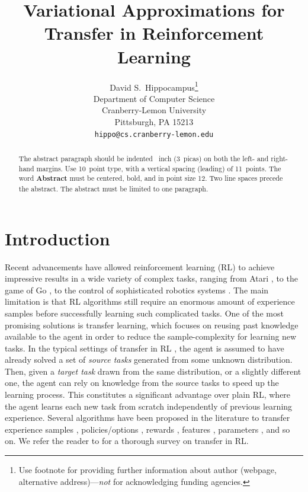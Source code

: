 \documentclass{article}
\title{Variational Approximations for Transfer in Reinforcement Learning}
\author{
  David S.~Hippocampus\thanks{Use footnote for providing further
    information about author (webpage, alternative
    address)---\emph{not} for acknowledging funding agencies.} \\
  Department of Computer Science\\
  Cranberry-Lemon University\\
  Pittsburgh, PA 15213 \\
  \texttt{hippo@cs.cranberry-lemon.edu} \\
}
\begin{document}

\maketitle

\begin{abstract}
  The abstract paragraph should be indented ~inch
  (3~picas) on both the left- and right-hand margins. Use 10~point
  type, with a vertical spacing (leading) of 11~points.  The word
  \textbf{Abstract} must be centered, bold, and in point size 12. Two
  line spaces precede the abstract. The abstract must be limited to
  one paragraph.
\end{abstract}

\section{Introduction}

Recent advancements have allowed reinforcement learning (RL) \cite{sutton1998reinforcement} to achieve impressive results in a wide variety of complex tasks, ranging from Atari \cite{mnih2015human}, to the game of Go \cite{silver2016mastering}, to the control of sophisticated robotics systems \cite{kober2009policy,lillicrap2015continuous,levine2016end}. The main limitation is that RL algorithms still require an enormous amount of experience samples before successfully learning such complicated tasks. One of the most promising solutions is transfer learning, which focuses on reusing past knowledge available to the agent in order to reduce the sample-complexity for learning new tasks. In the typical settings of transfer in RL \cite{taylor2009transfer}, the agent is assumed to have already solved a set of \textit{source tasks} generated from some unknown distribution. Then, given a \textit{target task} drawn from the same distribution, or a slightly different one, the agent can rely on knowledge from the source tasks to speed up the learning process. This constitutes a significant advantage over plain RL, where the agent learns each new task from scratch independently of previous learning experience. Several algorithms have been proposed in the literature to transfer experience samples \cite{lazaric2008transfer,taylor2008transferring}, policies/options \cite{fernandez2006probabilistic,konidaris2007building}, rewards \cite{konidaris2006autonomous}, features \cite{barreto2017successor}, parameters \cite{doshi2016hidden,killian2017robust}, and so on. We refer the reader to \cite{taylor2009transfer} for a thorough survey on transfer in RL.
\end{document}
